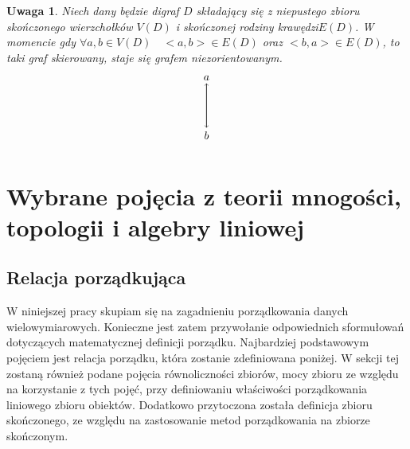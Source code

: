 \documentclass[12pt,a4paper]{report}
\newtheorem{definition}[theorem]{Definicja}
\newtheorem{uwaga}{Uwaga}
\begin{document}
\begin{uwaga}
Niech dany będzie digraf $D$ składający się z niepustego zbioru skończonego wierzchołków $V(D)$ i skończonej rodziny krawędzi$E(D)$. W momencie gdy $\forall{a,b} \in V(D) \quad <a,b> \in E(D)$ oraz $<b,a> \in E(D)$, to taki graf skierowany, staje się grafem niezorientowanym. 
$$
\begin{tikzpicture}[scale=.7]
\draw [->] (0,-2) --(0,0) ;
 \draw node(a) at (0,0.25) {$a$};
 \draw [->] (0,0) --(0,-2); 
 \draw node (b) at (0, -2.35) {$b$};
\end{tikzpicture}
$$

\end{uwaga}






\section{Wybrane pojęcia z teorii mnogości, topologii i algebry liniowej}\label{teoria mnogosci}
\subsection{Relacja porządkująca}


W niniejszej pracy skupiam się na zagadnieniu porządkowania danych wielowymiarowych. Konieczne jest zatem przywołanie odpowiednich sformułowań dotyczących matematycznej definicji porządku. Najbardziej podstawowym pojęciem jest relacja porządku, która zostanie zdefiniowana poniżej. W sekcji tej zostaną również podane pojęcia równoliczności zbiorów, mocy zbioru ze względu na korzystanie z tych pojęć, przy definiowaniu właściwości porządkowania liniowego zbioru obiektów. Dodatkowo przytoczona została definicja zbioru skończonego, ze względu na zastosowanie metod porządkowania na zbiorze skończonym.

\end{document}
